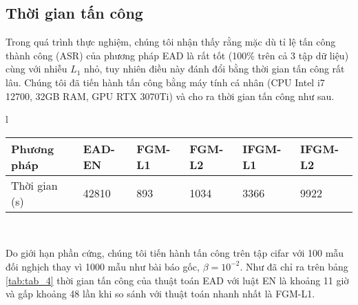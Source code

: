 \subsection{Thời gian tấn công}
Trong quá trình thực nghiệm, chúng tôi nhận thấy rằng mặc dù tỉ lệ tấn công thành công (ASR) của phương pháp EAD là rất tốt (100\% trên cả 3 tập dữ liệu) cùng với nhiễu $L_1$ nhỏ, tuy nhiên điều này đánh đổi bằng thời gian tấn công rất lâu. Chúng tôi đã tiến hành tấn công bằng máy tính cá nhân (CPU Intel i7 12700, 32GB RAM, GPU RTX 3070Ti) và cho ra thời gian tấn công như sau.
\begin{longtable}{l}
	\begin{tabular}{l|lllll}
		\hline
		Phương pháp & EAD-EN & FGM-L1 & FGM-L2 & IFGM-L1 & IFGM-L2 \\
		\hline
        Thời gian (s) & 42810 & 893 & 1034 & 3366 &	9922 \\
        \hline
	\end{tabular} \\
	\caption[Thời gian tính toán]{Thời gian tấn công của các thuật toán trên tập cifar}
	\label{tab:tab_4}
\end{longtable}	
Do giới hạn phần cứng, chúng tôi tiến hành tấn công trên tập cifar với 100 mẫu đối nghịch thay vì 1000 mẫu như bài báo gốc, $\beta = 10^{-2}$. Như đã chỉ ra trên bảng \ref{tab:tab_4} thời gian tấn công của thuật toán EAD với luật EN là khoảng 11 giờ và gấp khoảng 48 lần khi so sánh với thuật toán nhanh nhất là FGM-L1. 